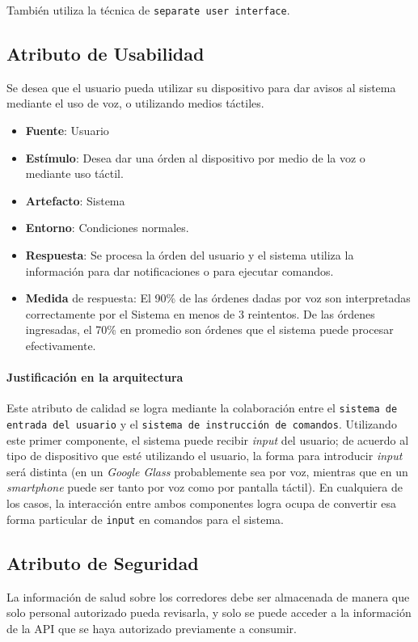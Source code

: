 También utiliza la técnica de \texttt{separate user interface}.


\subsection{Atributo de Usabilidad}
Se desea que el usuario pueda utilizar su dispositivo para dar avisos al sistema mediante el uso de voz, o utilizando medios táctiles.

\begin{itemize}
  \item \textbf{Fuente}: Usuario
  \item \textbf{Estímulo}: Desea dar una órden al dispositivo por medio de la voz o mediante uso táctil.
  \item \textbf{Artefacto}: Sistema
  \item \textbf{Entorno}: Condiciones normales.
  \item \textbf{Respuesta}: Se procesa la órden del usuario y el sistema utiliza la información para dar notificaciones o para ejecutar comandos.
  \item \textbf{Medida} de respuesta: El 90\% de las órdenes dadas por voz son interpretadas correctamente por el Sistema en menos de 3 reintentos. De las órdenes ingresadas, el 70\% en promedio son órdenes que el sistema puede procesar efectivamente.
\end{itemize}

\paragraph{Justificación en la arquitectura} %
Este atributo de calidad se logra mediante la colaboración entre el \texttt{sistema de entrada del usuario} y el \texttt{sistema de instrucción de comandos}. Utilizando este primer componente, el sistema puede recibir \textit{input} del usuario; de acuerdo al tipo de dispositivo que esté utilizando el usuario, la forma para introducir \textit{input} será distinta (en un \emph{Google Glass} probablemente sea por voz, mientras que en un \emph{smartphone} puede ser tanto por voz como por pantalla táctil). En cualquiera de los casos, la interacción entre ambos componentes logra ocupa de convertir esa forma particular de \texttt{input} en comandos para el sistema.


\subsection{Atributo de Seguridad}
La información de salud sobre los corredores debe ser almacenada de manera que solo personal autorizado pueda revisarla, y solo se puede acceder a la información de la API que se haya autorizado previamente a consumir.

